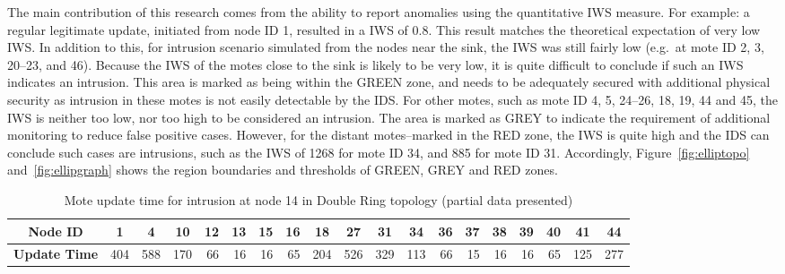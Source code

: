 \documentclass{CRPITStyle}
\newcommand*{\bd}[1]{\multicolumn{1}{|c|}{\bfseries #1}}
\begin{document}
The main contribution of this research comes from the ability to report anomalies using the quantitative IWS measure.
For example:  a regular legitimate update, initiated from node ID 1, resulted in a IWS of 0.8.
This result matches the theoretical expectation of very low IWS.
In addition to this, for intrusion scenario simulated from the nodes near the sink, the IWS was still fairly low (e.g.\ at mote ID 2, 3, 20--23, and 46). 
Because the IWS of the motes close to the sink is likely to be very low, it is quite difficult to conclude if such an IWS indicates an intrusion.
This area is marked as being within the GREEN zone, and needs to be adequately secured with additional physical security as intrusion in these motes is not easily detectable by the IDS.
For other motes, such as mote ID 4, 5, 24--26, 18, 19, 44 and 45, the IWS is neither too low, nor too high to be considered an intrusion. The area is marked as GREY to indicate the requirement of additional monitoring to reduce false positive cases.
However, for the distant motes--marked in the RED zone, the IWS is quite high and the IDS can conclude such cases are intrusions, such as the IWS of 1268 for mote ID 34, and 885 for mote ID 31. %
Accordingly, Figure~\ref{fig:elliptopo} and~\ref{fig:ellipgraph} shows the region boundaries and thresholds of GREEN, GREY and RED zones.%

\begin{table}[t]
\centering
\begin{tabular}{|l|*{17}{r|}r|}
\hline
\bd{Node ID}           & \bd{1} & \bd{4} & \bd{10} & \bd{12} & \bd{13} & \bd{15} & \bd{16} & \bd{18} & \bd{27} & \bd{31} & \bd{34} & \bd{36} & \bd{37} & \bd{38} & \bd{39} & \bd{40} & \bd{41} & \bd{44}\\
\hline
\bd{Update Time}  &   404 	&  588 	& 170 	& 66 	& 16 &	 16 	& 65 &	 204 &	 526 & 329 &	 113 &	 66 &	 15 	& 16 	& 16 &	 65 &	125 & 277 \\
\hline
\end{tabular}
\caption{Mote update time for intrusion at node 14 in Double Ring topology (partial data presented)}

\label{tab:dr_time_14}
\end{table}
\end{document}
